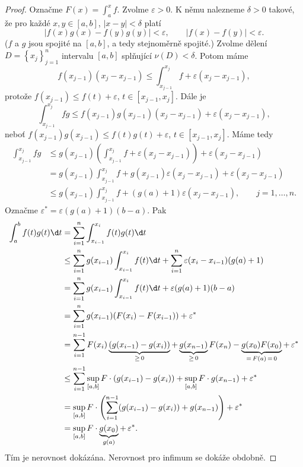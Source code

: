 \begin{proof}
	Označme $F(x) = \int_a^x f$. Zvolme $\varepsilon > 0$.
	K němu nalezneme $\delta > 0$ takové, že pro každé
	$x,y \in [a,b]$, $|x-y|<\delta$ platí
	$$
	    |f(x)g(x)-f(y)g(y)|<\varepsilon, \qquad |f(x)-f(y)|<\varepsilon.
	$$
	($f$ a $g$ jsou spojité na $[a,b]$, a tedy stejnoměrně spojité.) Zvolme dělení $D=\left \{ x_j \right \}_{j=1}^n$
	intervalu $[a,b]$ splňující $\nu(D)<\delta$. Potom máme
	$$
	f(x_{j-1})(x_j-x_{j-1}) \leq \int_{x_{j-1}}^{x_j} f + \varepsilon(x_j-x_{j-1}),
	$$
	protože $f(x_{j-1})\leq f(t)+\varepsilon$, $t \in [x_{j-1},x_j]$. Dále je
	$$
	    \int_{x_{j-1}}^{x_j} fg \leq f(x_{j-1})g(x_{j-1})(x_j-x_{j-1}) + \varepsilon(x_j-x_{j-1}),
	$$
	neboť $f(x_{j-1})g(x_{j-1})\leq f(t)g(t)+\varepsilon$, $t \in [x_{j-1},x_j]$. Máme tedy
	\begin{align*}
 \int_{x_{j-1}}^{x_j} fg & \leq g(x_{j-1})\left( \int_{x_{j-1}}^{x_j}f + \varepsilon(x_j-x_{j-1}) \right ) + \varepsilon(x_j-x_{j-1}) \\
 & = g(x_{j-1})\int_{x_{j-1}}^{x_j} f + g(x_{j-1})\varepsilon(x_j-x_{j-1})+\varepsilon(x_j-x_{j-1}) \\
 &\leq g(x_{j-1})\int_{x_{j-1}}^{x_j} f + (g(a)+1) \varepsilon (x_j - x_{j-1}), \qquad j=1,\dots,n.
	\end{align*}
	Označme $\varepsilon^* = \varepsilon(g(a)+1)(b-a)$. Pak
	\begin{align*}
	\int_a^b f(t)g(t)\d t &= \sum_{i=1}^n \int_{x_{i-1}}^{x_i}f(t)g(t)\d t \\
	& \leq \sum_{i=1}^n g(x_{i-1}) \int_{x_{i-1}}^{x_i} f(t)\d t + \sum_{i=1}^n \varepsilon(x_i - x_{i-1})(g(a)+1)\\
	&= \sum_{i=1}^n g(x_{i-1}) \int_{x_{i-1}}^{x_i} f(t) \d t + \varepsilon(g(a)+1)(b-a)\\
	&= \sum_{i=1}^n g(x_{i-1})(F(x_i)-F(x_{i-1}))+\varepsilon^* \\
	&= \sum_{i=1}^{n-1} F(x_i)\underbrace{(g(x_{i-1})-g(x_i))}_{\geq \, 0}+ \underbrace{g(x_{n-1})}_{\geq \, 0}F(x_n)-\underbrace{g(x_0)F(x_0)}_{= \, F(a)\, =\, 0} +\, \varepsilon^*\\
	& \leq \sum_{i=1}^{n-1} \sup_{[a,b]} F \cdot (g(x_{i-1})-g(x_i)) + \sup_{[a,b]} F \cdot g(x_{n-1}) + \varepsilon^*\\
	&= \sup_{[a,b]} F \cdot \left( \sum_{i=1}^{n-1} (g(x_{i-1})-g(x_i)) + g(x_{n-1}) \right ) + \varepsilon^* \\
    &= \sup_{[a,b]} F \cdot \underbrace{g(x_0)}_{g(a)} +\, \varepsilon^* .
\end{align*}
Tím je nerovnost dokázána. Nerovnost pro infimum se dokáže obdobně.
\end{proof}

